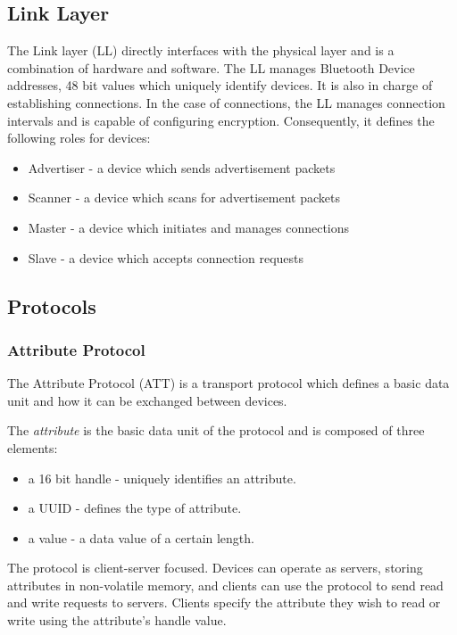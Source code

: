       \subsection{Link Layer}
    The Link layer (LL) directly interfaces with the physical layer and is a combination
    of hardware and software. The LL manages Bluetooth Device addresses, 48 bit
    values which uniquely identify devices. It is also in charge of establishing
    connections. In the case of connections, the LL manages connection intervals
    and is capable of configuring encryption. Consequently, it defines the following
    roles for devices:

    \begin{itemize}
      \item Advertiser - a device which sends advertisement packets
      \item Scanner - a device which scans for advertisement packets
      \item Master - a device which initiates and manages connections
      \item Slave - a device which accepts connection requests
    \end{itemize}

    \subsection{Protocols}
        \subsubsection{Attribute Protocol}
    The Attribute Protocol (ATT) is a transport protocol which defines a
    basic data unit and how it can be exchanged between devices.

    The \textit{attribute} is the basic data unit of the protocol and is composed
    of three elements:
    \begin{itemize}
      \item a 16 bit handle - uniquely identifies an attribute.
      \item a UUID - defines the type of attribute.
      \item a value - a data value of a certain length.
    \end{itemize}

    The protocol is client-server focused. Devices can operate as servers, storing
    attributes in non-volatile memory, and clients can use the protocol to send
    read and write requests to servers. Clients specify the attribute they wish to
    read or write using the attribute's handle value.

